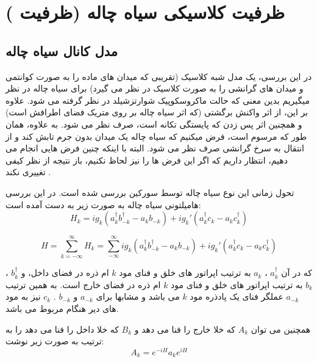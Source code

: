 \section{ظرفیت کلاسیکی سیاه چاله (ظرفیت )}
\subsection{مدل کانال سیاه چاله}
		در این بررسی، یک مدل شبه کلاسیک  (تقریبی که میدان های ماده را به صورت کوانتمی و میدان های گرانشی را به صورت کلاسیک در نظر می گیرد) برای سیاه چاله در نظر میگیریم بدین معنی که حالت ماکروسکوپیک شوارتزشیلد در نظر گرفته می شود. علاوه بر این، از اثر واکنش برگشتی
(که اثر سیاه چاله بر روی متریک فضای اطرافش است) و همچنین اثر پس زدن
که پایستگی تکانه است، صرف نظر می شود. به علاوه، همان طور که مرسوم است، فرض میکنیم که سیاه چاله یک میدان بدون جرم تابش کند و از انتقال به سرخ گرانشی
صرف نظر می شود. البته با اینکه چنین فرض هایی انجام می دهیم، انتظار داریم که اگر این فرض ها را نیز لحاظ نکنیم، باز نتیجه از نظر کیفی تغییری نکند
\cite{qit}.

تحول زمانی این نوع سیاه چاله توسط سورکین
\cite{sorkin}
بررسی شده است. در این بررسی هامیلتونی سیاه چاله به صورت زیر به دست آمده است:
\begin{equation}
	H_k =  i g_k (a_k^\dagger b_{-k}^\dagger - a_k b_{-k}) + i g_k ' (a_k^\dagger c_k - a_k c_k^\dagger)
\end{equation}


\begin{equation}
	H = \sum_{k=-\infty}^{\infty} H_k = \sum_{-\infty}^{\infty} i g_k (a_k^\dagger b_{-k}^\dagger - a_k b_{-k}) + i g_k ' (a_k^\dagger c_k - a_k c_k^\dagger)
\end{equation}

که در آن
$a_k^\dagger$
،
$a_k$
به ترتیب اپراتور های خلق و فنای مود 
$k$
ام ذره در فضای داخل،
و
$b_k^\dagger$
،
$b_k$
به ترتیب اپراتور های خلق و فنای مود 
$k$
ام ذره در فضای خارج است. به همین ترتیب
$a_{-k}$
عملگر فنای یک پادذره مود 
$k$
می باشد و مشابها برای 
$a_{-k}$
و
$b_{-k}$
.
$c_k$
نیز به مود های دیر هنگام مربوط می باشد.



همچنین می توان 
$A_k$
که خلا خارج را فنا می دهد و 
$B_k$
که خلا داخل را فنا می دهد را
 به ترتیب به صورت زیر نوشت:
\begin{equation}
	A_k = e^{-i H} a_k e^{i H}
\end{equation}

